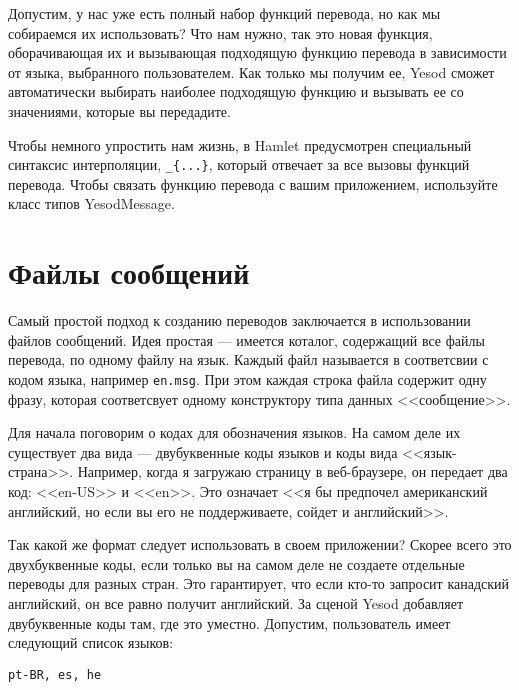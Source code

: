 Допустим, у нас уже есть полный набор функций перевода, но как мы собираемся их использовать? Что нам нужно, так это новая функция, оборачивающая их и вызывающая подходящую функцию перевода в зависимости от языка, выбранного пользователем. Как только мы получим ее, Yesod сможет автоматически выбирать наиболее подходящую функцию и вызывать ее со значениями, которые вы передадите.

Чтобы немного упростить нам жизнь, в Hamlet предусмотрен специальный синтаксис интерполяции, \lstinline'_{...}', который отвечает за все вызовы функций перевода. Чтобы связать функцию перевода с вашим приложением, используйте класс типов YesodMessage.

\section{Файлы сообщений} %

Самый простой подход к созданию переводов заключается в использовании файлов сообщений. Идея простая --- имеется коталог, содержащий все файлы перевода, по одному файлу на язык. Каждый файл называется в соответсвии с кодом языка, например \lstinline'en.msg'. При этом каждая строка файла содержит одну фразу, которая соответсвует одному конструктору типа данных <<сообщение>>.


Для начала поговорим о кодах для обозначения языков. На самом деле их существует два вида --- двубуквенные коды языков и коды вида <<язык-страна>>. Например, когда я загружаю страницу в веб-браузере, он передает два код: <<en-US>> и <<en>>. Это означает <<я бы предпочел американский английский, но если вы его не поддерживаете, сойдет и английский>>.

Так какой же формат следует использовать в своем приложении? Скорее всего это двухбуквенные коды, если только вы на самом деле не создаете отдельные переводы для разных стран. Это гарантирует, что если кто-то запросит канадский английский, он все равно получит английский. За сценой Yesod добавляет двубуквенные коды там, где это уместно. Допустим, пользователь имеет следующий список языков:

\begin{lstlisting}
pt-BR, es, he
\end{lstlisting}

